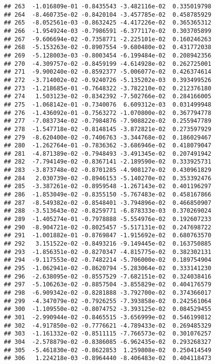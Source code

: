 \documentclass[
]{article}
\begin{document}
\begin{verbatim}
## 263  -1.016809e-01 -0.8435543 -3.482116e-02  0.335019798
## 264  -8.460735e-02 -0.8420104 -3.457785e-02  0.458785929
## 265  -8.052561e-03 -0.8632425 -4.417226e-02  0.365365312
## 266  -1.954924e-03 -0.7986591 -6.377117e-02  0.303705899
## 267  -9.606694e-02 -0.7358771 -2.225101e-02  0.160246263
## 268  -5.153263e-02 -0.8907554 -9.680480e-02  0.431772038
## 269  -5.128003e-03 -0.8003454 -6.199484e-02  0.208942356
## 270  -4.309757e-02 -0.8459199 -4.614928e-02  0.262725001
## 271  -9.900240e-02 -0.8592377 -5.006077e-02  0.426374614
## 272  -3.714002e-02 -0.9240726 -5.135202e-03  0.393499526
## 273  -1.218685e-01 -0.7648322 -3.782210e-02  0.212376180
## 274   1.503123e-02 -0.8342392 -7.502766e-02  0.284166005
## 275  -1.068142e-01 -0.7340076  6.609312e-03  0.031499948
## 276  -1.436092e-01 -0.7563272 -1.070800e-02  0.367794778
## 277  -7.083734e-02 -0.7984876 -7.908822e-02  0.255947789
## 278  -1.547718e-02 -0.8148145 -3.872821e-02  0.273597929
## 279  -8.620400e-02 -0.7406763 -3.344768e-02  0.186029467
## 280  -1.262764e-01 -0.7836362 -3.686946e-02  0.418079047
## 281  -4.871389e-02 -0.7948493 -3.491345e-02  0.207491942
## 282  -7.794149e-02 -0.8367141 -2.189590e-02  0.333925731
## 283  -3.873748e-02 -0.8701285 -4.908127e-02  0.430961829
## 284   2.030739e-02 -0.8946153 -5.140270e-02  0.353392476
## 285  -3.387261e-02 -0.8959548 -1.267143e-02  0.401196297
## 286  -1.853049e-02 -0.8355150 -5.767483e-02  0.458167866
## 287  -8.549382e-02 -0.8548401 -3.794896e-02  0.466850907
## 288  -3.513643e-02 -0.8259771 -6.878333e-03  0.370269024
## 289  -1.405274e-01 -0.7978888 -5.554976e-02  0.192607233
## 290  -8.904721e-02 -0.8025457 -5.517131e-02  0.247698722
## 291  -1.001882e-01 -0.8769847 -1.915692e-02  0.680763570
## 292   3.151522e-02 -0.8493216 -9.149445e-02  0.163750885
## 293  -1.856351e-02 -0.8270347 -4.815775e-02  0.382302131
## 294  -9.117553e-02 -0.7482214 -5.706000e-02  0.189754904
## 295  -1.062941e-02 -0.8620794 -5.283064e-02  0.333141230
## 296  -2.638095e-02 -0.8557529 -7.682151e-02  0.324038416
## 297  -5.106263e-02 -0.8857504 -3.855829e-02  0.404176579
## 298  -6.909342e-02 -0.8281888 -3.792700e-02  0.374366017
## 299  -4.347079e-02 -0.7926255 -7.393858e-02  0.242561064
## 300  -1.109550e-02 -0.8074752 -3.393125e-02  0.084529455
## 301  -2.990944e-02 -0.8465515 -3.656999e-02  0.546199812
## 302  -4.917850e-02 -0.7776621 -4.789433e-02  0.269485329
## 303  -1.161332e-02 -0.8511115 -7.766573e-02  0.301076257
## 304  -2.578879e-02 -0.8386085 -6.962435e-02  0.293268327
## 305  -5.461830e-02 -0.8622853  1.259808e-02  0.250414549
## 306   1.224218e-03 -0.8964440 -8.406483e-02  0.404118473

\end{verbatim}
\end{document}
